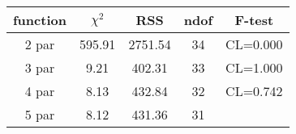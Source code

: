 \begin{tabular}{c|c|c|c|c}
function & $\chi^2$ & RSS & ndof & F-test \\
\hline
2 par & 595.91 & 2751.54 & 34 & CL=0.000 \\
3 par & 9.21 & 402.31 & 33 & CL=1.000 \\
4 par & 8.13 & 432.84 & 32 & CL=0.742 \\
5 par & 8.12 & 431.36 & 31 & \\
\hline
\end{tabular}